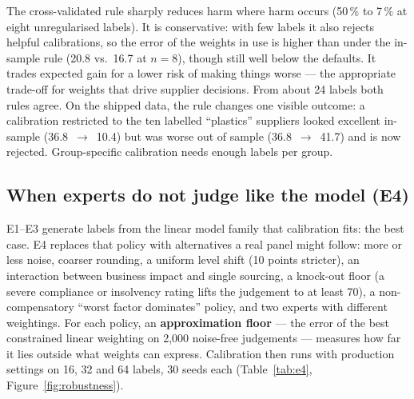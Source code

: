 \documentclass[10pt,twocolumn,a4paper]{article}
\begin{document}
The cross-validated rule sharply reduces harm where harm occurs (50\,\% to 7\,\% at eight
unregularised labels). It is conservative: with few labels it also rejects helpful
calibrations, so the error of the weights in use is higher than under the in-sample rule
(20.8 vs.\ 16.7 at $n=8$), though still well below the defaults. It trades expected gain
for a lower risk of making things worse --- the appropriate trade-off for weights that
drive supplier decisions. From about 24 labels both rules agree. On the shipped data,
the rule changes one visible outcome: a calibration restricted to the ten labelled
``plastics'' suppliers looked excellent in-sample (36.8~$\rightarrow$~10.4) but was worse
out of sample (36.8~$\rightarrow$~41.7) and is now rejected. Group-specific calibration
needs enough labels per group.

\subsection{When experts do not judge like the model (E4)}
\label{sec:e4}
E1--E3 generate labels from the linear model family that calibration fits: the best case.
E4 replaces that policy with alternatives a real panel might follow: more or less noise,
coarser rounding, a uniform level shift (10 points stricter), an interaction between
business impact and single sourcing, a knock-out floor (a severe compliance or insolvency
rating lifts the judgement to at least 70), a non-compensatory ``worst factor dominates''
policy, and two experts with different weightings. For each policy, an
\textbf{approximation floor} --- the error of the best constrained linear weighting on
2{,}000 noise-free judgements --- measures how far it lies outside what weights can
express. Calibration then runs with production settings on 16, 32 and 64 labels, 30 seeds
each (Table~\ref{tab:e4}, Figure~\ref{fig:robustness}).
\end{document}
